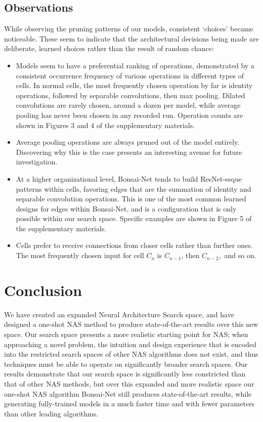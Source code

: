 \documentclass[10pt,twocolumn,letterpaper]{article}
\begin{document}
\subsection{Observations} 
While observing the pruning patterns of our models, consistent `choices' became noticeable. These seem to indicate that the architectural decisions being made are deliberate, learned choices rather than the result of random chance:
\begin{itemize}
\setlength\itemsep{0em}
\item Models seem to have a preferential ranking of operations, demonstrated by a consistent occurrence frequency of various operations in different types of cells. In normal cells, the most frequently chosen operation by far is identity operations, followed by separable convolutions, then max pooling. Dilated convolutions are rarely chosen, around a dozen per model, while average pooling has never been chosen in any recorded run. Operation counts are shown in Figures 3 and 4 of the supplementary materials.
\item Average pooling operations are always pruned out of the model entirely. Discovering why this is the case presents an interesting avenue for future investigation.
\item At a higher organizational level, Bonsai-Net tends to build ResNet-esque \cite{he2015} patterns within cells, favoring edges that are the summation of identity and separable convolution operations. This is one of the most common learned designs for edges within Bonsai-Net, and is a configuration that is only possible within our search space. Specific examples are shown in Figure 5 of the  supplementary materials.
\item Cells prefer to receive connections from closer cells rather than further ones. The most frequently chosen input for cell $C_n$ is $C_{n-1}$, then $C_{n-2},$ and so on. 
\end{itemize}
 
\section{Conclusion}
We have created an expanded Neural Architecture Search space, and have designed a one-shot NAS method to produce state-of-the-art results over this new space. Our search space presents a more realistic starting point for NAS; when approaching a novel problem, the intuition and design experience that is encoded into the restricted search spaces of other NAS algorithms does not exist, and thus techniques must be able to operate on significantly broader search spaces. Our results demonstrate that our search space is significantly less constricted than that of other NAS methods, but over this expanded and more realistic space our one-shot NAS algorithm Bonsai-Net still produces state-of-the-art results, while generating fully-trained models in a much faster time and with fewer parameters than other leading algorithms.
{\small


}
\newpage



\end{document}

